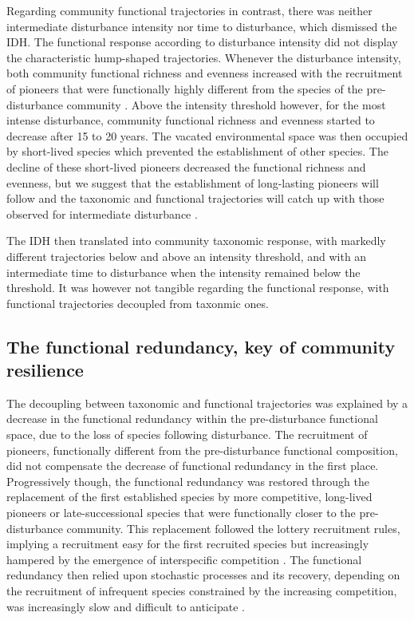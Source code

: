 \documentclass[fleqn,10pt]{ArtEcoFoG} %
\begin{document}
Regarding community functional trajectories in contrast, there was
neither intermediate disturbance intensity nor time to disturbance,
which dismissed the IDH. The functional response according to
disturbance intensity did not display the characteristic hump-shaped
trajectories. Whenever the disturbance intensity, both community
functional richness and evenness increased with the recruitment of
pioneers that were functionally highly different from the species of the
pre-disturbance community \citep{Denslow1980, Molino2001}. Above the
intensity threshold however, for the most intense disturbance, community
functional richness and evenness started to decrease after 15 to 20
years. The vacated environmental space was then occupied by short-lived
species which prevented the establishment of other species. The decline
of these short-lived pioneers decreased the functional richness and
evenness, but we suggest that the establishment of long-lasting pioneers
will follow and the taxonomic and functional trajectories will catch up
with those observed for intermediate disturbance \citep{Walker2009}.

The IDH then translated into community taxonomic response, with markedly
different trajectories below and above an intensity threshold, and with
an intermediate time to disturbance when the intensity remained below
the threshold. It was however not tangible regarding the functional
response, with functional trajectories decoupled from taxonmic ones.

\subsection{The functional redundancy, key of community
resilience}\label{the-functional-redundancy-key-of-community-resilience}

The decoupling between taxonomic and functional trajectories was
explained by a decrease in the functional redundancy within the
pre-disturbance functional space, due to the loss of species following
disturbance. The recruitment of pioneers, functionally different from
the pre-disturbance functional composition, did not compensate the
decrease of functional redundancy in the first place. Progressively
though, the functional redundancy was restored through the replacement
of the first established species by more competitive, long-lived
pioneers or late-successional species that were functionally closer to
the pre-disturbance community. This replacement followed the lottery
recruitment rules, implying a recruitment easy for the first recruited
species but increasingly hampered by the emergence of interspecific
competition \citep{Busing2002}. The functional redundancy then relied
upon stochastic processes and its recovery, depending on the recruitment
of infrequent species constrained by the increasing competition, was
increasingly slow and difficult to anticipate
\citep{Elmqvist2003, Diaz2005}.
\end{document}
